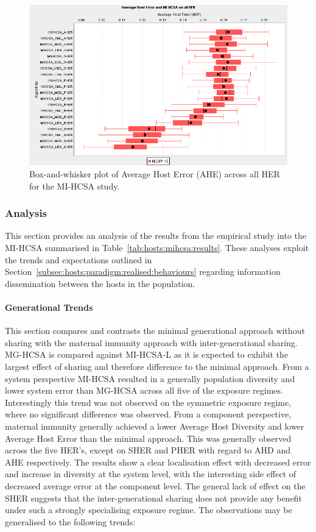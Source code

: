 \begin{figure}[htp]
	\centering
		\includegraphics[scale=0.70]{Hosts/MI-HCSA-AHE}
	\caption{Box-and-whisker plot of Average Host Error (AHE) across all HER for the MI-HCSA study.}
	\label{fig:hosts:mihcsa:ahe:boxplot}
\end{figure}


%
%
\subsubsection{Analysis}
This section provides an analysis of the results from the empirical study into the MI-HCSA summarised in Table~\ref{tab:hosts:mihcsa:results}. These analyses exploit the trends and expectations outlined in Section~\ref{subsec:hosts:paradigm:realised:behaviours} regarding information dissemination between the hosts in the population.

%
%
\paragraph{Generational Trends}
This section compares and contrasts the minimal generational approach without sharing with the maternal immunity approach with inter-generational sharing. MG-HCSA is compared against MI-HCSA-L as it is expected to exhibit the largest effect of sharing and therefore difference to the minimal approach.
From a system perspective MI-HCSA resulted in a generally population diversity and lower system error than MG-HCSA across all five of the exposure regimes. Interestingly this trend was not observed on the symmetric exposure regime, where no significant difference was observed.
From a component perspective, maternal immunity generally achieved a lower Average Host Diversity and lower Average Host Error than the minimal approach. This was generally observed across the five HER's, except on SHER and PHER with regard to AHD and AHE respectively.
The results show a clear localisation effect with decreased error and increase in diversity at the system level, with the interesting side effect of decreased average error at the component level. The general lack of effect on the SHER suggests that the inter-generational sharing does not provide any benefit under such a strongly specialising exposure regime. The observations may be generalised to the following trends: 


